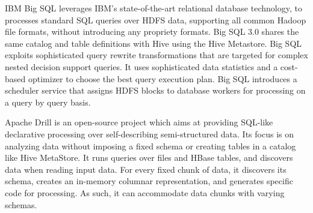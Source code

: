 \documentclass{vldb}
\begin{document}
IBM Big SQL \cite{bigsql} leverages IBM's state-of-the-art relational database technology, 
to processes standard SQL queries over HDFS data, supporting all common Hadoop file formats, without introducing any propriety formats.
Big SQL 3.0 shares the same catalog and table definitions with Hive using the Hive Metastore. 
Big SQL exploits sophisticated query rewrite transformations \cite{pirahesh96, winmagic} that are targeted for complex nested decision support queries. It uses sophisticated data statistics and a cost-based optimizer to choose the best query execution plan. 
Big SQL introduces a scheduler service that assigns HDFS blocks to database workers for processing on a query by query basis. 

Apache Drill \cite{drill} is an open-source project which aims at providing SQL-like declarative processing over self-describing semi-structured data. Its focus is on analyzing data without imposing a fixed schema or creating tables in a catalog like Hive MetaStore. It runs queries over files and HBase tables, and discovers data when reading input data. For every fixed chunk of data, it discovers its schema, creates an in-memory columnar representation, and generates specific code for processing. As such, it can accommodate data chunks with varying schemas. 

\end{document}
